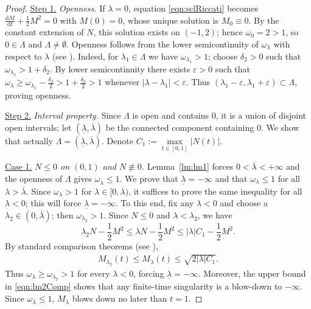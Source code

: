 \documentclass{amsart}
\begin{document}
\begin{proof}
\underline{Step 1.} \emph{Openness.}
If $\lambda=0$, equation \eqref{eqn:sclRiccati} becomes $\frac{\mathrm{d}M}{\mathrm{d}t} + \frac12 M^{2} = 0$ with $M(0)=0$, whose unique solution is $M_{0}\equiv0$. By the constant extension of $N$, this solution exists on $(-1,2)$; hence $\omega_{0} = 2 > 1$, so $0\in\Lambda$ and $\Lambda \not =\emptyset$.
Openness follows from the lower semicontinuity of $\omega_{\lambda}$ with respect to $\lambda$ (see \cite[Chapter~V, Theorem~2.1]{Hartman02}). Indeed, for $\lambda_{1}\in\Lambda$ we have $\omega_{\lambda_{1}}>1$; choose $\delta_2>0$ such that $\omega_{\lambda_{1}}>1+\delta_2$. By lower semicontinuity there exists $\varepsilon>0$ such that
$\omega_{\lambda} \ge \omega_{\lambda_{1}} - \frac{\delta_2}{2} > 1 + \frac{\delta_2}{2} > 1$ whenever $|\lambda-\lambda_{1}|<\varepsilon$. Thus $(\lambda_{1}-\varepsilon,\lambda_{1}+\varepsilon)\subset\Lambda$, proving openness.

\underline{Step 2.} \emph{Interval property.}
Since $\Lambda$ is open and contains $0$, it is a union of disjoint open intervals; let $(\underline{\lambda},\overline{\lambda})$ be the connected component containing $0$. We show that actually $\Lambda = (\underline{\lambda},\overline{\lambda})$. Denote $C_{1} := \max\limits_{t\in[0,1]}|N(t)|$.

\underline{Case 1.} \emph{$N \le 0$ on $(0,1)$ and $N \not\equiv 0$.}
Lemma~\ref{lm:lm1} forces $0<\overline{\lambda}<+\infty$ and the openness of $\Lambda$ gives $\omega_{\overline{\lambda}}\le 1$.
We prove that $\underline{\lambda}=-\infty$ and that $\omega_{\lambda}\le 1$ for all $\lambda>\overline{\lambda}$.
Since $\omega_{\lambda}>1$ for $\lambda\in[0,\overline{\lambda})$, it suffices to prove the same inequality for all $\lambda<0$; this will force $\underline{\lambda}=-\infty$.
To this end, fix any $\lambda<0$ and choose a $\lambda_2 \in (0,\overline{\lambda})$; then $\omega_{\lambda_2}>1$.
Since $N\le0$ and $\lambda<\lambda_{2}$, we have
\[
\lambda_{2} N - \frac12 M^{2} \le \lambda N - \frac12 M^{2} \le |\lambda| C_{1} - \frac12 M^{2}.
\]
By standard comparison theorems (see \cite[Chapter~III, Corollary~4.2]{Hartman02}),
\begin{align}\label{eqn:lm2Comp}
M_{\lambda_{2}}(t) \le M_{\lambda}(t) \le \sqrt{2|\lambda| C_{1}}.
\end{align}
Thus $\omega_{\lambda} \ge \omega_{\lambda_{2}} > 1$ for every $\lambda<0$, forcing $\underline{\lambda}=-\infty$.
Moreover, the upper bound in \eqref{eqn:lm2Comp} shows that any finite-time singularity is a blow-down to $-\infty$.
Since $\omega_{\overline{\lambda}} \le 1$, $M_{\overline{\lambda}}$ blows down no later than $t=1$.


\end{proof}
\end{document}
